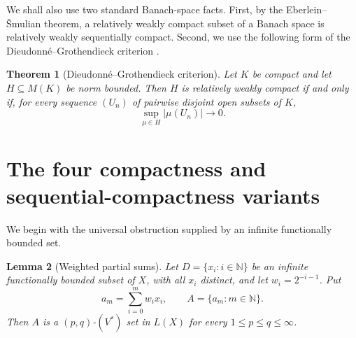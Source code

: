 \documentclass[11pt]{article}
\newtheorem{theorem}{Theorem}[section]
\newtheorem{lemma}[theorem]{Lemma}
\newcommand{\N}{\mathbb N}
\begin{document}
We shall also use two standard Banach-space facts.  First, by the
Eberlein--\v Smulian theorem, a relatively weakly compact subset of a Banach
space is relatively weakly sequentially compact.  Second, we use the following
form of the Dieudonn\'e--Grothendieck criterion
\cite{Wells1969}.

\begin{theorem}[Dieudonn\'e--Grothendieck criterion]\label{thm:DG}
Let $K$ be compact and let $H\subseteq M(K)$ be norm bounded.  Then $H$ is
relatively weakly compact if and only if, for every sequence $(U_n)$ of pairwise
disjoint open subsets of $K$,
\[
  \sup_{\mu\in H}|\mu(U_n)|\longrightarrow0.
\]
\end{theorem}

\section{The four compactness and sequential-compactness variants}

We begin with the universal obstruction supplied by an infinite functionally
bounded set.

\begin{lemma}[Weighted partial sums]\label{lem:weighted-v}
Let $D=\{x_i:i\in\N\}$ be an infinite functionally bounded subset of $X$, with
all $x_i$ distinct, and let $w_i=2^{-i-1}$.  Put
\[
  a_m=\sum_{i=0}^m w_i x_i,
  \qquad
  A=\{a_m:m\in\N\}.
\]
Then $A$ is a $(p,q)$-$(V^*)$ set in $L(X)$ for every
$1\leq p\leq q\leq\infty$.
\end{lemma}
\end{document}
